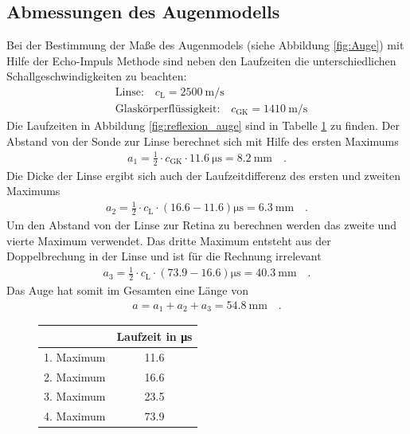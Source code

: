   \subsection{Abmessungen des Augenmodells}
Bei der Bestimmung der Maße des Augenmodels (siehe Abbildung \ref{fig:Auge}) mit Hilfe der Echo-Impuls Methode sind neben den Laufzeiten die unterschiedlichen Schallgeschwindigkeiten zu beachten:
\begin{align}
	& \text{Linse:} \quad c_\text{L} = \SI{2500}{\meter\per\second} \\
	& \text{Glaskörperflüssigkeit:} \quad c_\text{GK} = \SI{1410}{\meter\per\second} 
\end{align}
Die Laufzeiten in Abbildung \ref{fig:reflexion_auge} sind in Tabelle \ref{tab:laufzeiten_auge} zu finden.
Der Abstand von der Sonde zur Linse berechnet sich mit Hilfe des ersten Maximums
\begin{align}
	a_1 = \frac{1}{2}\cdot  c_\text{GK} \cdot \SI{11.6}{\micro\second} =
	\SI{8.2}{\milli\meter}  \quad .
\end{align}
Die Dicke der Linse ergibt sich auch der Laufzeitdifferenz des ersten und zweiten Maximums
\begin{align}
	a_2 = \frac{1}{2}\cdot  c_\text{L} \cdot (16.6-11.6)\si{\micro\second} =
	\SI{6.3}{\milli\meter}  \quad .
\end{align}
Um den Abstand von der Linse zur Retina zu berechnen werden das zweite und vierte Maximum verwendet. Das dritte Maximum entsteht aus der Doppelbrechung in der Linse und ist für die Rechnung irrelevant
\begin{align}
	a_3 = \frac{1}{2}\cdot  c_\text{L} \cdot (73.9-16.6)\si{\micro\second} =
	\SI{40.3}{\milli\meter}  \quad .
\end{align}
Das Auge hat somit im Gesamten eine Länge von 
\begin{align}
	a = a_1 + a_2 + a_3 = \SI{54.8}{\milli\meter} \quad .
\end{align}




	


   \begin{figure}[h!]
   	\centering
   	\begin{tabular}{c|c}
   		& Laufzeit in \si{\micro\second}\\
   		\hline
   		1. Maximum & 11.6 \\
   		2. Maximum & 16.6 \\
   		3. Maximum & 23.5 \\
   		4. Maximum & 73.9
   	\end{tabular}
   	\label{tab:laufzeiten_auge}
   \end{figure}
  
